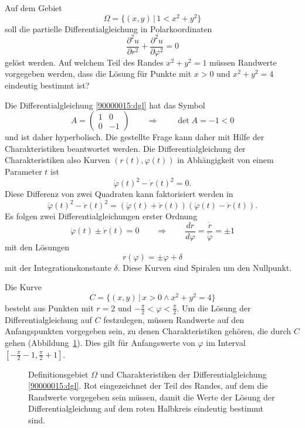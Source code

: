 Auf dem Gebiet
\[
\Omega = \{ (x,y)\,|\, 1 < x^2 + y^2\}
\]
soll die partielle Differentialgleichung in Polarkoordinaten
\begin{equation}
\frac{\partial^2 u}{\partial r^2}
+
\frac{\partial^2 u}{\partial \varphi^2}
=
0
\label{90000015:dgl}
\end{equation}
gelöst werden.
Auf welchem Teil des Randes $x^2 +y^2 = 1$ müssen Randwerte vorgegeben
werden, dass die Lösung für Punkte mit $x>0$ und $x^2 + y^2 = 4$
eindeutig bestimmt ist?

\begin{loesung}
Die Differentialgleichung \eqref{90000015:dgl} hat das Symbol
\[
A
=
\begin{pmatrix}
1&0\\
0&-1
\end{pmatrix}
\qquad\Rightarrow\qquad
\det A=-1<0
\]
und ist daher hyperbolisch.
Die gestellte Frage kann daher mit Hilfe der Charakteristiken beantwortet
werden.
Die Differentialgleichung der Charakteristiken also Kurven $(r(t),\varphi(t))$
in Abhängigkeit von einem Parameter $t$ ist
\[
\dot\varphi(t)^2 - \dot r(t)^2=0.
\]
Diese Differenz von zwei Quadraten kann faktorisiert werden in
\[
\dot\varphi(t)^2 - \dot r(t)^2
=
(\dot\varphi(t) + \dot r(t))
(\dot\varphi(t) - \dot r(t)).
\]
Es folgen zwei Differentialgleichungen erster Ordnung
\[
\dot\varphi(t)\pm\dot r(t) = 0
\qquad\Rightarrow\qquad
\frac{dr}{d\varphi}
=
\frac{\dot r}{\dot \varphi}
=
\pm 1
\]
mit den Lösungen
\[
r(\varphi) =  \pm \varphi + \delta
\]
mit der Integrationskonstante $\delta$.
Diese Kurven sind Spiralen um den Nullpunkt.

Die Kurve 
\[
C
=
\{ (x,y)\,|\, x>0\wedge x^2 +y^2=4\}
\]
besteht aus Punkten mit $r=2$ und $-\frac{\pi}{2}<\varphi<\frac{\pi}2$.
Um die Lösung der Differentialgleichung auf $C$ festzulegen, müssen
Randwerte auf den Anfangspunkten vorgegeben sein, zu denen Charakteristiken
gehören, die durch $C$ gehen (Abbildung~\ref{90000015:fig}).
Dies gilt für Anfangswerte von $\varphi$ im Interval
$[-\frac{\pi}2-1,\frac{\pi}2+1]$.
\begin{figure}
\centering
{}
\caption{Definitionsgebiet $\Omega$ und Charakteristiken der
Differentialgleichung \eqref{90000015:dgl}.
Rot eingezeichnet der Teil des Randes, auf dem die Randwerte vorgegeben
sein müssen, damit die Werte der Lösung der Differentialgleichung auf dem
roten Halbkreis eindeutig bestimmt sind.
\label{90000015:fig}}
\end{figure}
\end{loesung}


